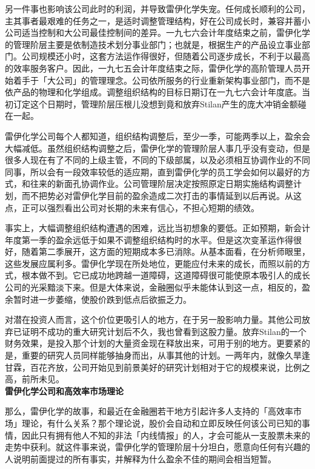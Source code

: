 \documentclass[UTF8,a4paper,zihao=-4,fontset = windows]{ctexart} %
\begin{document}
另一件事也影响该公司此时的利润，并导致雷伊化学失宠。任何成长顺利的公司，主其事者最艰难的任务之一，是适时调整管理结构，好在公司成长时，兼容并蓄小公司适当控制和大公司最佳控制间的差异。一九七六会计年度结束之前，雷伊化学的管理阶层主要是依制造技术划分事业部门；也就是，根据生产的产品设立事业部门。公司规模还小时，这套方法运作得很好，但随着公司逐步成长，不利于以最高的效率服务客户。因此，一九七五会计年度结束之际，雷伊化学的高阶管理人员开始着手于「大公司」的管理理念。公司依所服务的行业重新架构事业部门，而不是依产品的物理和化学组成。调整组织结构的目标日期订在一九七六会计年度底。当初订定这个日期时，管理阶层压根儿没想到竟和放弃Stilan产生的庞大冲销金额碰在一起。

雷伊化学公司每个人都知道，组织结构调整后，至少一季，可能两季以上，盈余会大幅减低。虽然组织结构调整之后，雷伊化学的管理阶层人事几乎没有变动，但是很多人现在有了不同的上级主管，不同的下级部属，以及必须相互协调作业的不同同事，所以会有一段效率较低的适应期，直到雷伊化学的员工学会如何以最好的方式，和往来的新面孔协调作业。公司管理阶层决定按照原定日期实施结构调整计划，而不把势必对雷伊化学目前的盈余造成二次打击的事情延到以后再说。从这点，正可以强烈看出公司对长期的未来有信心，不担心短期的绩效。

事实上，大幅调整组织结构遭遇的困难，远比当初想象的要低。正如预期，新会计年度第一季的盈余远低于如果不调整组织结构时的水平。但是这次变革运作得很好，随着第二季展开，这方面的短期成本多已消除。从基本面看，在分析师眼里，这些发展应属利多。雷伊化学现在所处地位，更能应付未来的成长，而照以前的方式，根本做不到。它已成功地跨越一道障碍，这道障碍很可能使原本吸引人的成长公司的光采黯淡下来。但是大体来说，金融圈似乎未能体认到这一点，相反的，盈余暂时进一步萎缩，使股价跌到低点后欲振乏力。

对潜在投资人而言，这个价位更吸引人的地方，在于另一股影响力量。其他公司放弃已证明不成功的重大研究计划后不久，我也曾看到这股力量。放弃Stilan的一个财务效果，是投入那个计划的大量资金现在释放出来，可用于别的地方。更要紧的是，重要的研究人员同样能够抽身而出，从事其他的计划。一两年内，就像久旱逢甘霖，百花齐放，公司开始见到前景美好的研究计划相对于它的规模来说，比例之高，前所未见。
\\

\textbf{雷伊化学公司和高效率市场理论}


那么，雷伊化学的故事，和最近在金融圈若干地方引起许多人支持的「高效率市场」理论，有什么关系？那个理论说，股价会自动和立即反映任何该公司已知的事情，因此只有拥有他人不知的非法「内线情报」的人，才会可能从一支股票未来的走势中获利。就这件事来说，雷伊化学的管理阶层十分坦白，愿意向任何有兴趣的人说明前面提过的所有事实，并解释为什么盈余不佳的期间会相当短暂。
\end{document}
